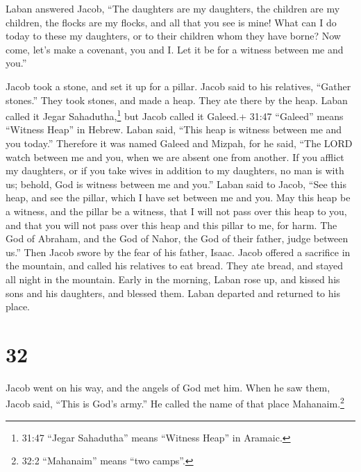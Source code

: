  Laban answered Jacob, ``The daughters are my daughters,
the children are my children, the flocks are my flocks, and all that you
see is mine! What can I do today to these my daughters, or to their
children whom they have borne?  Now come, let's make a
covenant, you and I. Let it be for a witness between me and you.''

 Jacob took a stone, and set it up for a pillar.
 Jacob said to his relatives, ``Gather stones.'' They took
stones, and made a heap. They ate there by the heap.  Laban
called it Jegar Sahadutha,\footnote{31:47 ``Jegar Sahadutha'' means
  ``Witness Heap'' in Aramaic.} but Jacob called it Galeed.+ 31:47
``Galeed'' means ``Witness Heap'' in Hebrew.  Laban said,
``This heap is witness between me and you today.'' Therefore it was
named Galeed  and Mizpah, for he said, ``The LORD watch
between me and you, when we are absent one from another. 
If you afflict my daughters, or if you take wives in addition to my
daughters, no man is with us; behold, God is witness between me and
you.''  Laban said to Jacob, ``See this heap, and see the
pillar, which I have set between me and you.  May this heap
be a witness, and the pillar be a witness, that I will not pass over
this heap to you, and that you will not pass over this heap and this
pillar to me, for harm.  The God of Abraham, and the God of
Nahor, the God of their father, judge between us.'' Then Jacob swore by
the fear of his father, Isaac.  Jacob offered a sacrifice
in the mountain, and called his relatives to eat bread. They ate bread,
and stayed all night in the mountain.  Early in the
morning, Laban rose up, and kissed his sons and his daughters, and
blessed them. Laban departed and returned to his place.

\hypertarget{section-31}{%
\section{32}\label{section-31}}

 Jacob went on his way, and the angels of God met him.
 When he saw them, Jacob said, ``This is God's army.'' He
called the name of that place Mahanaim.\footnote{32:2 ``Mahanaim'' means
  ``two camps''.}

